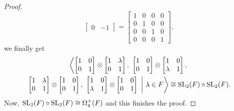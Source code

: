 \begin{proof}
\begin{equation*}
\begin{bmatrix}
				0 & -1
		\end{bmatrix} = 
		\begin{bmatrix}
			1 & 0 & 0 & 0 \\
			0 & 1 & 0 & 0 \\
			0 & 0 & 1 & 0 \\
			0 & 0 & 0 & 1
		\end{bmatrix},
	\end{equation*}
	we finally get
	\begin{multline*}
		\left\langle
			\begin{bmatrix}
				1 & 0 \\
				0 & 1
			\end{bmatrix} \otimes 
			\begin{bmatrix}
				1 & \lambda \\
				0 & 1
			\end{bmatrix},\ 
			\begin{bmatrix}
				1 & 0 \\
				0 & 1
			\end{bmatrix} \otimes
			\begin{bmatrix}
				1 & 0 \\
				\lambda & 1
			\end{bmatrix}, \right. \\
			\left. \begin{bmatrix}
				1 & \lambda \\
				0 & 1
			\end{bmatrix} \otimes 
			\begin{bmatrix}
				1 & 0 \\
				0 & 1
			\end{bmatrix},\ 
			\begin{bmatrix}
				1 & 0 \\
				\lambda & 1
			\end{bmatrix} \otimes
			\begin{bmatrix}
				1 & 0 \\
				0 & 1
			\end{bmatrix}\ 
			\bigg|
			\ 
			\lambda \in F
		\right\rangle \cong \SL_2(F) \circ \SL_2(F).
	\end{multline*}
	Now, $\mathrm{SL}_2(F) \circ \mathrm{SL}_2(F) \cong \Omega_4^+(F)$ and this finishes the proof. 
\end{proof}

